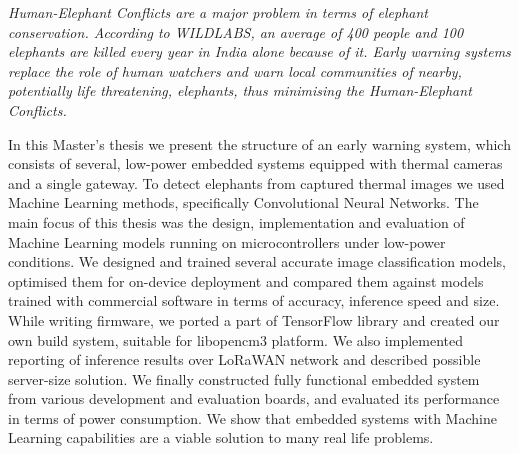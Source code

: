 {\itshape
Human-Elephant Conflicts are a major problem in terms of elephant conservation.
According to WILDLABS, an average of 400 people and 100 elephants are killed every year in India alone because of it. 
Early warning systems replace the role of human watchers and warn local communities of nearby, potentially life threatening, elephants, thus minimising the Human-Elephant Conflicts.

In this Master's thesis we present the structure of an early warning system, which consists of several, low-power embedded systems equipped with thermal cameras and a single gateway.
To detect elephants from captured thermal images we used Machine Learning methods, specifically Convolutional Neural Networks.
The main focus of this thesis was the design, implementation and evaluation of Machine Learning models running on microcontrollers under low-power conditions.
We designed and trained several accurate image classification models, optimised them for on-device deployment and compared them against models trained with commercial software in terms of accuracy, inference speed and size.
While writing firmware, we ported a part of TensorFlow library and created our own build system, suitable for libopencm3 platform. 
We also implemented reporting of inference results over LoRaWAN network and described possible server-size solution.
We finally constructed fully functional embedded system from various development and evaluation boards, and evaluated its performance in terms of power consumption.
We show that embedded systems with Machine Learning capabilities are a viable solution to many real life problems.
}
\newpage
